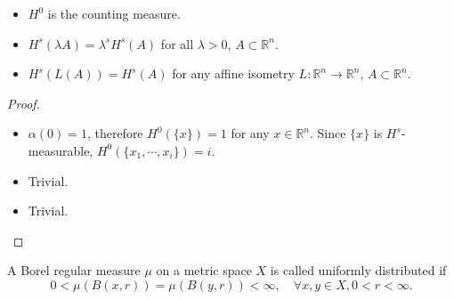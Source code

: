     \begin{theorem}\label{thm:hausdorff-basic-properties}
        \begin{itemize}
            \item[(i)] $H^{0}$ is the counting measure.
            \item[(ii)] $H^{s}(\lambda A)=\lambda ^{s}H^{s}(A)$ for all $\lambda>0$, $A\subset \mathbb{R}^{n}$.
            \item[(iii)] $H^{s}(L(A))=H^{s}(A)$ for any affine isometry $L:\mathbb{R}^{n}\to \mathbb{R}^{n}$, $A\subset \mathbb{R}^{n}$.
        \end{itemize}
    \end{theorem}
    \begin{proof}
        \begin{itemize}
            \item[(i)] $\alpha(0)=1$, therefore $H^{0}(\{ x \})=1$ for any $x \in \mathbb{R}^{n}$. Since $\{ x \}$ is $H^{s}$-measurable, $H^{0}(\{ x_{1},\cdots,x_{i} \})=i$.
            \item[(ii)] Trivial.
            \item[(iii)] Trivial.\qedhere
        \end{itemize}
    \end{proof}

    \begin{definition}
        A Borel regular measure $\mu$ on a metric space $X$ is called uniformly distributed if
        \[
        0< \mu(B(x,r))=\mu(B(y,r))< \infty,\quad \forall x,y \in X, 0<r<\infty.
        \]
    \end{definition}

